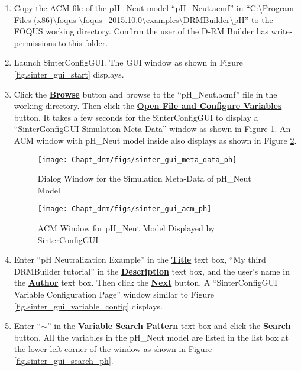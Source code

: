 \begin{enumerate}
	\item Copy the ACM file of the pH\_Neut model ``pH\_Neut.acmf'' in ``C:\textbackslash Program Files (x86)\textbackslash foqus \textbackslash foqus\_2015.10.0\textbackslash examples\textbackslash DRMBuilder\textbackslash pH'' to the FOQUS working directory.  Confirm the user of the D-RM Builder has write-permissions to this folder.
	\item Launch SinterConfigGUI.  The GUI window as shown in Figure \ref{fig.sinter_gui_start} displays.
	\item Click the \textbf{\underline{Browse}} button and browse to the ``pH\_Neut.acmf'' file in the working directory.  Then click the \textbf{\underline{Open File and Configure Variables}} button.  It takes a few seconds for the SinterConfigGUI to display a ``SinterGonfigGUI Simulation Meta-Data'' window as shown in Figure \ref{fig.sinter_gui_meta_data_ph}.  An ACM window with pH\_Neut model inside also displays as shown in Figure \ref{fig.sinter_gui_acm_ph}.
	\begin{figure}[H]
		\begin{center}
			\texttt{[image: Chapt\_drm/figs/sinter\_gui\_meta\_data\_ph]}
			\caption{Dialog Window for the Simulation Meta-Data of pH\_Neut Model}
			\label{fig.sinter_gui_meta_data_ph}
		\end{center}
	\end{figure}
	\begin{figure}[H]
		\begin{center}
			\texttt{[image: Chapt\_drm/figs/sinter\_gui\_acm\_ph]}
			\caption{ACM Window for pH\_Neut Model Displayed by SinterConfigGUI}
			\label{fig.sinter_gui_acm_ph}
		\end{center}
	\end{figure}
	\item Enter ``pH Neutralization Example'' in the \textbf{\underline{Title}} text box, ``My third DRMBuilder tutorial'' in the \textbf{\underline{Description}} text box, and the user's name in the \textbf{\underline{Author}} text box.  Then click the \textbf{\underline{Next}} button.  A ``SinterConfigGUI Variable Configuration Page'' window similar to Figure \ref{fig.sinter_gui_variable_config} displays.
	\item Enter ``$\sim$'' in the \textbf{\underline{Variable Search Pattern}} text box and click the \textbf{\underline{Search}} button.  All the variables in the pH\_Neut model are listed in the list box at the lower left corner of the window as shown in Figure \ref{fig.sinter_gui_search_ph}.

\end{enumerate}
